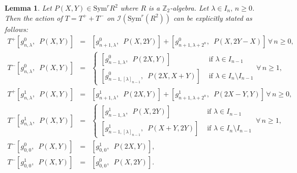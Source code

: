 \documentclass[10pt,a4paper]{amsart}
\newtheorem{lemma}{Lemma}
\newcommand\Sym{{\mathrm {Sym}}}
\begin{document}
\begin{lemma}\label{T}
 Let $P(X,Y) \in \Sym^{r}R^{2}$ where $R$ is a $\mathbb{Z}_{2}$-algebra. Let $\lambda \in I_{n},\,n\geq 0$. 
 Then the action of $T=T^+ + T^-$ on $\mathcal{I}(\Sym^{r}(R^{2}))$ can be explicitly stated as follows:
\begin{eqnarray*}
T^+\left[g_{n,\lambda}^0,\enspace P(X,Y)\right]& = &\left[g_{n+1,\lambda}^{0},\enspace P(X,2Y)\right] +  \left[g_{n+1, \lambda+2^n}^{0},\enspace  P(X,2Y-X)\right] \,\forall \,n\geq0,\\
T^-\left[g_{n,\lambda}^0,\enspace P(X,Y)\right] &= & \begin{cases} \left[g_{n-1,\lambda}^{0}, \enspace P(2X,Y)\right]& \text{ if } \lambda \in I_{n-1}\\
\left[g_{n-1,[\lambda]_{n-1}}^{0},\enspace P(2X, X+Y)\right]& \text{ if } \lambda \in I_{n}\setminus I_{n-1}
\end{cases}\forall\, n\geq1,\\
T^+\left[g_{n,\lambda}^1,\enspace P(X,Y)\right]& = &\left[g_{n+1,\lambda}^{1},\enspace P(2X,Y)\right] +  \left[g_{n+1, \lambda+2^n}^{1},\enspace P(2X-Y,Y)\right] \,\forall\,n\geq0,\\
T^-\left[g_{n,\lambda}^1,\enspace P(X,Y)\right] &= & \begin{cases} \left[g_{n-1,\lambda}^{1},\enspace P(X,2Y)\right]& \text{ if } \lambda \in I_{n-1}\\
\left[g_{n-1,[\lambda]_{n-1}}^{1},\enspace P(X+Y, 2Y)\right]& \text{ if } \lambda \in I_{n}\setminus I_{n-1}
\end{cases}\, \forall\, n\geq1,\\
T^-\left[g_{0,0}^0,\enspace P(X,Y)\right] &= & \left[g_{0,0}^{1},\enspace P(2X,Y)\right],\\
T^-\left[g_{0,0}^1,\enspace P(X,Y)\right] &= & \left[g_{0,0}^{0},\enspace  P(X,2Y)\right].
\end{eqnarray*}
\end{lemma}
\end{document}
